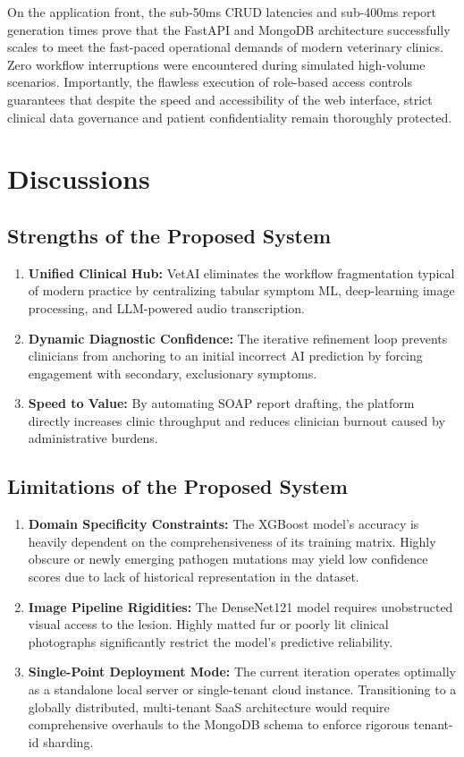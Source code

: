 \documentclass[a4paper,12pt]{report}
\begin{document}
On the application front, the sub-50ms CRUD latencies and sub-400ms report generation times prove that the FastAPI and MongoDB architecture successfully scales to meet the fast-paced operational demands of modern veterinary clinics. Zero workflow interruptions were encountered during simulated high-volume scenarios. Importantly, the flawless execution of role-based access controls guarantees that despite the speed and accessibility of the web interface, strict clinical data governance and patient confidentiality remain thoroughly protected.

\section{Discussions}

\subsection{Strengths of the Proposed System}
\begin{enumerate}
    \item \textbf{Unified Clinical Hub:} VetAI eliminates the workflow fragmentation typical of modern practice by centralizing tabular symptom ML, deep-learning image processing, and LLM-powered audio transcription.
    \item \textbf{Dynamic Diagnostic Confidence:} The iterative refinement loop prevents clinicians from anchoring to an initial incorrect AI prediction by forcing engagement with secondary, exclusionary symptoms.
    \item \textbf{Speed to Value:} By automating SOAP report drafting, the platform directly increases clinic throughput and reduces clinician burnout caused by administrative burdens.
\end{enumerate}

\subsection{Limitations of the Proposed System}
\begin{enumerate}
    \item \textbf{Domain Specificity Constraints:} The XGBoost model's accuracy is heavily dependent on the comprehensiveness of its training matrix. Highly obscure or newly emerging pathogen mutations may yield low confidence scores due to lack of historical representation in the dataset.
    \item \textbf{Image Pipeline Rigidities:} The DenseNet121 model requires unobstructed visual access to the lesion. Highly matted fur or poorly lit clinical photographs significantly restrict the model's predictive reliability.
    \item \textbf{Single-Point Deployment Mode:} The current iteration operates optimally as a standalone local server or single-tenant cloud instance. Transitioning to a globally distributed, multi-tenant SaaS architecture would require comprehensive overhauls to the MongoDB schema to enforce rigorous tenant-id sharding.
\end{enumerate}
\end{document}
